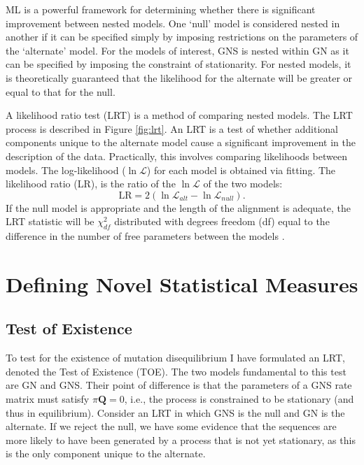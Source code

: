 ML is a powerful framework for determining whether there is significant improvement between \gls{nested} models. One `null' model is considered nested in another if it can be specified simply by imposing restrictions on the parameters of the `alternate' model.  For the models of interest, GNS is nested within GN as it can be specified by imposing the constraint of stationarity. For nested models, it is theoretically guaranteed that the likelihood for the alternate will be greater or equal to that for the null. 

A likelihood ratio test (LRT) is a method of comparing nested models. The LRT process is described in Figure \ref{fig:lrt}. An LRT is a test of whether additional components unique to the alternate model cause a significant improvement in the description of the data. Practically, this involves comparing likelihoods between models. The log-likelihood ($\ln\mathcal{L}$) for each model is obtained via fitting. The likelihood ratio (LR), is the ratio of the $\ln\mathcal{L}$ of the two models:
$$\mathrm{LR} = 2(\ln \mathcal{L}_{alt} -  \ln \mathcal{L}_{null}).$$
If the null model is appropriate and the length of the alignment is adequate, the LRT statistic will be $\chi^2_{df}$ distributed with degrees freedom (df) equal to the difference in the number of free parameters between the models \citep{Lindgren1993StatisticalTheory, Silvey1975StatisticalInference, Kendall1979TheStatistics}.



\section{Defining Novel Statistical Measures}
\label{Novel Statistical}

\subsection{Test of Existence}
\label{Test of Existence}

To test for the existence of mutation disequilibrium I have formulated an LRT, denoted the Test of Existence (TOE). The two models fundamental to this test are GN and GNS. Their point of difference is that the parameters of a GNS rate matrix must satisfy $\pi\mathbf{Q}=0$, i.e., the process is constrained to be stationary (and thus in equilibrium). Consider an LRT in which GNS is the null and GN is the alternate. If we reject the null, we have some evidence that the sequences are more likely to have been generated by a process that is not yet stationary, as this is the only component unique to the alternate.

